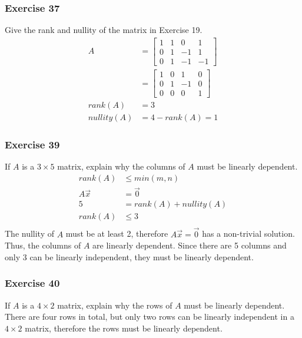 \documentclass[letterpaper, 12pt]{math}
\begin{document}
\subsubsection*{Exercise 37}
Give the rank and nullity of the matrix in Exercise 19.
\begin{align*}
  A &= \begin{bmatrix}
    1 & 1 & 0 & 1 \\
    0 & 1 & -1 & 1 \\
    0 & 1 & -1 & -1
  \end{bmatrix} \\
  &= \begin{bmatrix}
    1 & 0 & 1 & 0 \\
    0 & 1 & -1 & 0 \\
    0 & 0 & 0 & 1
  \end{bmatrix} \\
  rank(A) &= 3 \\
  nullity(A) &= 4-rank(A) = 1
\end{align*}

\subsubsection*{Exercise 39}
If \( A \) is a \( 3\times5 \) matrix, explain why the columns of \( A \) must
be linearly dependent.
\begin{align*}
  rank(A) &\le min(m,n) \\
  A\vec{x} &= \vec{0} \\
  5 &= rank(A)+nullity(A) \\
  rank(A) &\le 3 \\
\end{align*}
The nullity of \( A \) must be at least 2, therefore \( A\vec{x} = \vec{0} \)
has a non-trivial solution. Thus, the columns of \( A \) are linearly
dependent. Since there are 5 columns and only 3 can be linearly independent,
they must be linearly dependent.

\subsubsection*{Exercise 40}
If \( A \) is a \( 4\times2 \) matrix, explain why the rows of \( A \) must
be linearly dependent. \\
There are four rows in total, but only two rows can be linearly independent in
a \( 4\times2 \) matrix, therefore the rows must be linearly dependent.
\end{document}
